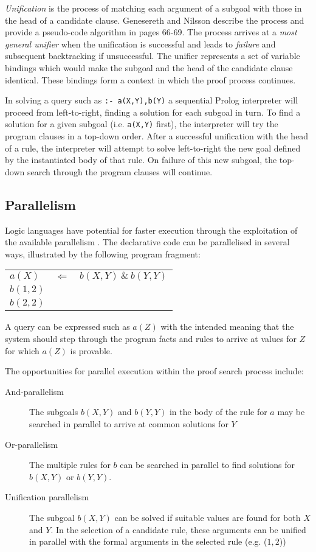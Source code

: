 \textit{Unification} is the process of matching each argument of a subgoal with
those in the head of a candidate clause.  Genesereth and Nilsson describe the
process and provide a pseudo-code algorithm in \cite{GN86} pages 66-69.
The process arrives at a \textit{most general unifier} when the unification is successful
and leads to \textit{failure} and subsequent backtracking if unsuccessful.  The
unifier represents a set of variable bindings which would make the subgoal and the
head of the candidate clause identical.  These bindings form a context in which the
proof process continues.

In solving a query such as \texttt{:- a(X,Y),b(Y)} a sequential Prolog interpreter
will proceed from left-to-right, finding a solution for each subgoal in turn.  To
find a solution for a given subgoal (i.e. \texttt{a(X,Y)} first), the interpreter will
try the program clauses in a top-down order.  After a successful unification with the
head of a rule, the interpreter will attempt to solve left-to-right
the new goal defined by the
instantiated body of that rule.  On failure of this new subgoal, the top-down
search through the program clauses will continue.

\subsection{Parallelism}

Logic languages have potential for faster execution through the
exploitation of the available parallelism \cite{Tic91}.  The 
declarative code can be parallelised in several ways, illustrated by the
following program fragment:

\begin{tabular}{l l l}
$a(X)$   &$\Leftarrow$ &$b(X,Y)\  \&\  b(Y,Y)$\\
$b(1,2)$ &             &\\
$b(2,2)$ &             &\\
\end{tabular}

A query can be expressed such as $a(Z)$
with the intended meaning that the system should
step through the program facts and rules to arrive at values for $Z$
for which $a(Z)$ is provable.

The opportunities for parallel execution
within the proof search process include:
\begin{description}
\item[And-parallelism]{The subgoals $b(X,Y)$ and $b(Y,Y)$
  in the body of the rule for $a$ may be searched in
  parallel to arrive at common solutions for $Y$}
\item[Or-parallelism]{The multiple rules for $b$ can be searched in
  parallel to find solutions for $b(X,Y)$ or $b(Y,Y)$.}
\item[Unification parallelism]{The subgoal $b(X,Y)$ can be solved if
  suitable values are found for both $X$ and $Y$.  In the selection of
  a candidate rule, these arguments can be unified in parallel with the
  formal arguments in the selected rule (e.g. ($1,2$))}
\end{description}

